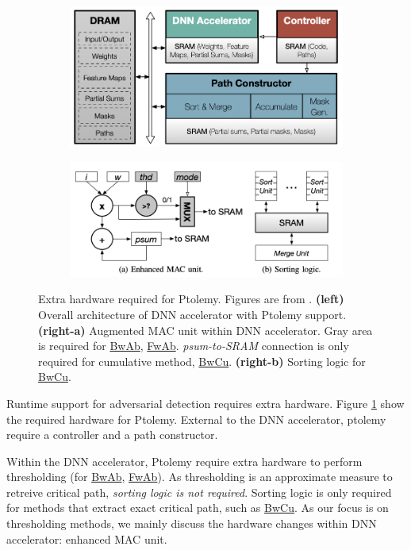 \documentclass[11pt]{article}
\begin{document}
\begin{figure}[H]
    \centering
    \begin{subfigure}{.45\textwidth}
      \centering
      \includegraphics[width=.8\linewidth]{images/hw.png}
    \end{subfigure}
    \begin{subfigure}{.45\textwidth}
      \centering
      \includegraphics[width=.8\linewidth]{images/aug.png}
    \end{subfigure}
    \caption{Extra hardware required for Ptolemy. Figures are from \cite{ptolemy}. \textbf{(left)} Overall architecture of DNN accelerator with Ptolemy support. \textbf{(right-a)} Augmented MAC unit within DNN accelerator. Gray area is required for \underline{BwAb}, \underline{FwAb}. \textit{psum-to-SRAM} connection is only required for cumulative method, \underline{BwCu}. \textbf{(right-b)} Sorting logic for \underline{BwCu}. \label{fig:mac-aug}}
\end{figure}

Runtime support for adversarial detection requires extra hardware. Figure \ref{fig:mac-aug} show the required hardware for Ptolemy. External to the DNN accelerator, ptolemy require a controller and a path constructor.

Within the DNN accelerator, Ptolemy require extra hardware to perform thresholding (for \underline{BwAb}, \underline{FwAb}). As thresholding is an approximate measure to retreive critical path, \textit{sorting logic is not required}. Sorting logic is only required for methods that extract exact critical path, such as \underline{BwCu}. As our focus is on thresholding methods, we mainly discuss the hardware changes within DNN accelerator: enhanced MAC unit.
\end{document}
